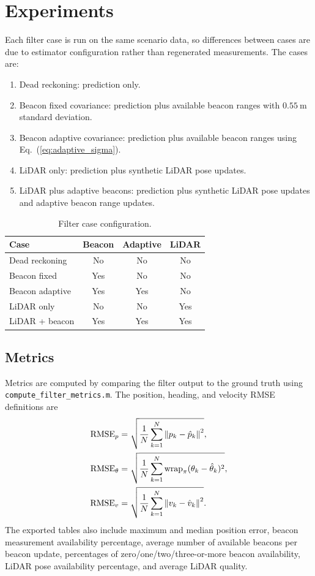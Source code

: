 \section{Experiments}

Each filter case is run on the same scenario data, so differences between cases are due to estimator configuration rather than regenerated measurements. The cases are:
\begin{enumerate}
    \item Dead reckoning: prediction only.
    \item Beacon fixed covariance: prediction plus available beacon ranges with \(0.55~\mathrm{m}\) standard deviation.
    \item Beacon adaptive covariance: prediction plus available beacon ranges using Eq.~(\ref{eq:adaptive_sigma}).
    \item LiDAR only: prediction plus synthetic LiDAR pose updates.
    \item LiDAR plus adaptive beacons: prediction plus synthetic LiDAR pose updates and adaptive beacon range updates.
\end{enumerate}

\begin{table}
\centering
\caption{Filter case configuration.}
\label{tab:filter_cases}
\begin{tabular}{lccc}
\toprule
Case & Beacon & Adaptive & LiDAR\\
\midrule
Dead reckoning & No & No & No\\
Beacon fixed & Yes & No & No\\
Beacon adaptive & Yes & Yes & No\\
LiDAR only & No & No & Yes\\
LiDAR + beacon & Yes & Yes & Yes\\
\bottomrule
\end{tabular}
\end{table}

\subsection{Metrics}

Metrics are computed by comparing the filter output to the ground truth using \texttt{compute\_filter\_metrics.m}. The position, heading, and velocity RMSE definitions are
\begin{align}
    \mathrm{RMSE}_p &=
    \sqrt{\frac{1}{N}\sum_{k=1}^{N}\left\lVert p_k-\hat{p}_k \right\rVert^{2}},\\
    \mathrm{RMSE}_{\theta} &=
    \sqrt{\frac{1}{N}\sum_{k=1}^{N}
    \operatorname{wrap}_{\pi}(\theta_k-\hat{\theta}_k)^2},\\
    \mathrm{RMSE}_v &=
    \sqrt{\frac{1}{N}\sum_{k=1}^{N}\left\lVert v_k-\hat{v}_k \right\rVert^{2}}.
\end{align}
The exported tables also include maximum and median position error, beacon measurement availability percentage, average number of available beacons per beacon update, percentages of zero/one/two/three-or-more beacon availability, LiDAR pose availability percentage, and average LiDAR quality.
